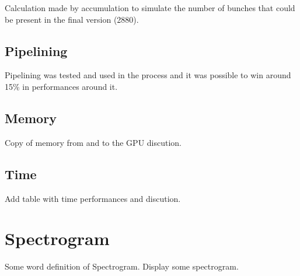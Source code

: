 Calculation made by accumulation to simulate the number of bunches that could be present in the final version (2880).

   \subsection{Pipelining}

	Pipelining was tested and used in the process and it was possible to win around 15\% in performances around it.

   \subsection{Memory}

	Copy of memory from and to the GPU discution.

   \subsection{Time}

	Add table with time performances and discution.

\section{Spectrogram}

Some word definition of Spectrogram. Display some spectrogram.